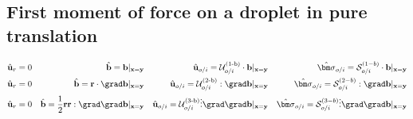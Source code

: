 
\subsection{First moment of force on a droplet in pure translation}

\begin{align}
    \hat{\textbf{u}}_r = 0
    && 
    \hat{\textbf{b}} = \textbf{b}|_{\textbf{x}=\textbf{y}} 
    && 
    \hat{\textbf{u}}_{o/i} = \mathcal{U}_{o/i}^\text{(1-b)}\cdot  \textbf{b}|_{\textbf{x}=\textbf{y}} 
    && 
    \hat{\bm\sigma}_{o/i} = \mathcal{S}_{o/i}^{(1-b)}\cdot \textbf{b}|_{\textbf{x}=\textbf{y}} \\
    \hat{\textbf{u}}_r = 0
    && 
    \hat{\textbf{b}} = \textbf{r}\cdot \grad\textbf{b}|_{\textbf{x}=\textbf{y}} 
    && 
    \hat{\textbf{u}}_{o/i} = \mathcal{U}_{o/i}^\text{(2-b)}:  \grad\textbf{b}|_{\textbf{x}=\textbf{y}} 
    && 
    \hat{\bm\sigma}_{o/i} = \mathcal{S}_{o/i}^{(2-b)}:\grad \textbf{b}|_{\textbf{x}=\textbf{y}} \\
    \hat{\textbf{u}}_r = 0
    && 
    \hat{\textbf{b}} = \frac{1}{2}\textbf{rr} : \grad\grad\textbf{b}|_{\textbf{x}=\textbf{y}} 
    && 
    \hat{\textbf{u}}_{o/i} = \mathcal{U}_{o/i}^\text{(3-b)}\vdots  \grad\grad\textbf{b}|_{\textbf{x}=\textbf{y}} 
    && 
    \hat{\bm\sigma}_{o/i} = \mathcal{S}_{o/i}^{(3-b)}\vdots\grad\grad \textbf{b}|_{\textbf{x}=\textbf{y}} \\
    \label{eq:test_prob1}
\end{align}

